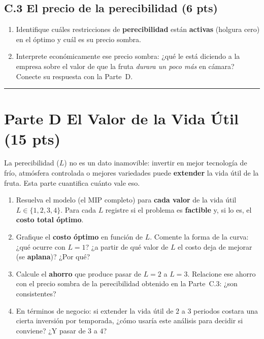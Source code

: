 \documentclass[12pt,a4paper]{article}
\begin{document}
\subsection*{C.3 \quad El precio de la perecibilidad \hfill\normalfont\normalsize(6 pts)}

\begin{enumerate}[label=\alph*), leftmargin=*, topsep=2pt]
    \item Identifique cuáles restricciones de \textbf{perecibilidad} están
          \textbf{activas} (holgura cero) en el óptimo y cuál es su precio sombra.
    \item Interprete económicamente ese precio sombra: ¿qué le está diciendo a la
          empresa sobre el valor de que la fruta \emph{durara un poco más} en
          cámara? Conecte su respuesta con la Parte~D.
\end{enumerate}

\noindent\rule{\linewidth}{0.4pt}
\newpage
\section*{Parte D \quad El Valor de la Vida Útil \hfill\normalfont\normalsize(15 pts)}

La perecibilidad ($L$) no es un dato inamovible: invertir en mejor tecnología de
frío, atmósfera controlada o mejores variedades puede \textbf{extender} la vida
útil de la fruta. Esta parte cuantifica cuánto vale eso.

\begin{enumerate}[label=\alph*), leftmargin=*, topsep=2pt]
    \item Resuelva el modelo (el MIP completo) para \textbf{cada valor} de la vida
          útil $L\in\{1,2,3,4\}$. Para cada $L$ registre si el problema es
          \textbf{factible} y, si lo es, el \textbf{costo total óptimo}.
    \item Grafique el \textbf{costo óptimo} en función de $L$. Comente la forma de
          la curva: ¿qué ocurre con $L=1$? ¿a partir de qué valor de $L$ el costo
          deja de mejorar (se \textbf{aplana})? ¿Por qué?
    \item Calcule el \textbf{ahorro} que produce pasar de $L=2$ a $L=3$. Relacione
          ese ahorro con el precio sombra de la perecibilidad obtenido en la
          Parte~C.3: ¿son consistentes?
    \item En términos de negocio: si extender la vida útil de $2$ a $3$ periodos
          costara una cierta inversión por temporada, ¿cómo usaría este análisis
          para decidir si conviene? ¿Y pasar de $3$ a $4$?
\end{enumerate}
\end{document}

